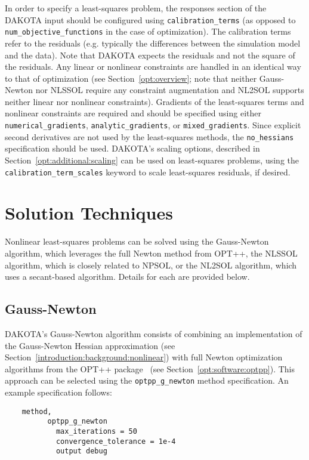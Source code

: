 In order to specify a least-squares problem, the responses section of
the DAKOTA input should be configured using
\texttt{calibration\_terms} (as opposed to
\texttt{num\_objective\_functions} in the case of optimization). 
The calibration terms refer to the residuals (e.g. typically the differences between 
the simulation model and the data).  Note that DAKOTA expects the residuals and 
not the square of the residuals.  Any
linear or nonlinear constraints are handled in an identical way to
that of optimization (see Section~\ref{opt:overview}; note that
neither Gauss-Newton nor NLSSOL require any constraint augmentation
and NL2SOL supports neither linear nor nonlinear constraints).
Gradients of the least-squares terms and nonlinear constraints are
required and should be specified using either
\texttt{numerical\_gradients}, \texttt{analytic\_gradients}, or
\texttt{mixed\_gradients}. Since explicit second derivatives
are not used by the least-squares methods,
the \texttt{no\_hessians} specification should be used.  DAKOTA's
scaling options, described in Section~\ref{opt:additional:scaling} can
be used on least-squares problems, using the
\texttt{calibration\_term\_scales} keyword to scale least-squares
residuals, if desired.

\section{Solution Techniques}\label{nls:solution}

Nonlinear least-squares problems can be solved using the Gauss-Newton
algorithm, which leverages the full Newton method from OPT++, the
NLSSOL algorithm, which is closely related to NPSOL, or the NL2SOL
algorithm, which uses a secant-based algorithm. Details for each are
provided below.

\subsection{Gauss-Newton}\label{nls:solution:gauss}

DAKOTA's Gauss-Newton algorithm consists of combining an
implementation of the Gauss-Newton Hessian approximation (see
Section~\ref{introduction:background:nonlinear}) with full Newton
optimization algorithms from the OPT++ package~\cite{MeOlHoWi07} (see
Section~\ref{opt:software:optpp}). This approach can be selected using
the \texttt{optpp\_g\_newton} method specification. An example
specification follows:
\begin{small}
\begin{verbatim}
    method,
          optpp_g_newton
            max_iterations = 50
            convergence_tolerance = 1e-4
            output debug
\end{verbatim}
\end{small}

